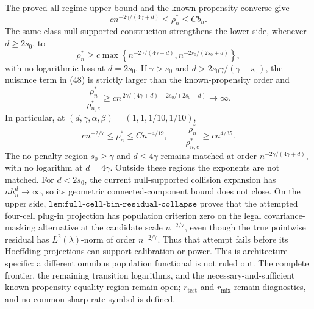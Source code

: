 The proved all-regime upper bound and the known-propensity converse give
\[
 c n^{-2\gamma/(4\gamma+d)}\le\rho_n^*\le Cb_n.
\]
The same-class null-supported construction strengthens the lower side, whenever \(d\ge2s_0\), to
\[
 \rho_n^*\ge c\max\left\{
 n^{-2\gamma/(4\gamma+d)},
 n^{-2s_0/(2s_0+d)}
 \right\},                                                                           \tag{48}
\]
with no logarithmic loss at \(d=2s_0\).  If \(\gamma>s_0\) and \(d>2s_0\gamma/(\gamma-s_0)\), the nuisance term in (48) is strictly larger than the known-propensity order and
\[
 \frac{\rho_n^*}{\rho_{n,e}^*}
 \ge c n^{\,2\gamma/(4\gamma+d)-2s_0/(2s_0+d)}\longrightarrow\infty.                  \tag{49}
\]
In particular, at \((d,\gamma,\alpha,\beta)=(1,1,1/10,1/10)\),
\[
 c n^{-2/7}\le\rho_n^*\le Cn^{-4/19},
 \qquad
 \frac{\rho_n^*}{\rho_{n,e}^*}\ge c n^{4/35}.                                       \tag{50}
\]
The no-penalty region \(s_0\ge\gamma\) and \(d\le4\gamma\) remains matched at order \(n^{-2\gamma/(4\gamma+d)}\), with no logarithm at \(d=4\gamma\).  Outside these regions the exponents are not matched.  For \(d<2s_0\), the current null-supported collision expansion has \(nh_n^d\to\infty\), so its geometric connected-component bound does not close.  On the upper side, \(\texttt{lem:full-cell-bin-residual-collapse}\) proves that the attempted four-cell plug-in projection has population criterion zero on the legal covariance-masking alternative at the candidate scale \(n^{-2/7}\), even though the true pointwise residual has \(L^2(\lambda)\)-norm of order \(n^{-2/7}\).  Thus that attempt fails before its Hoeffding projections can support calibration or power.  This is architecture-specific: a different omnibus population functional is not ruled out.  The complete frontier, the remaining transition logarithms, and the necessary-and-sufficient known-propensity equality region remain open; \(r_{\mathrm{test}}\) and \(r_{\mathrm{mix}}\) remain diagnostics, and no common sharp-rate symbol is defined.
